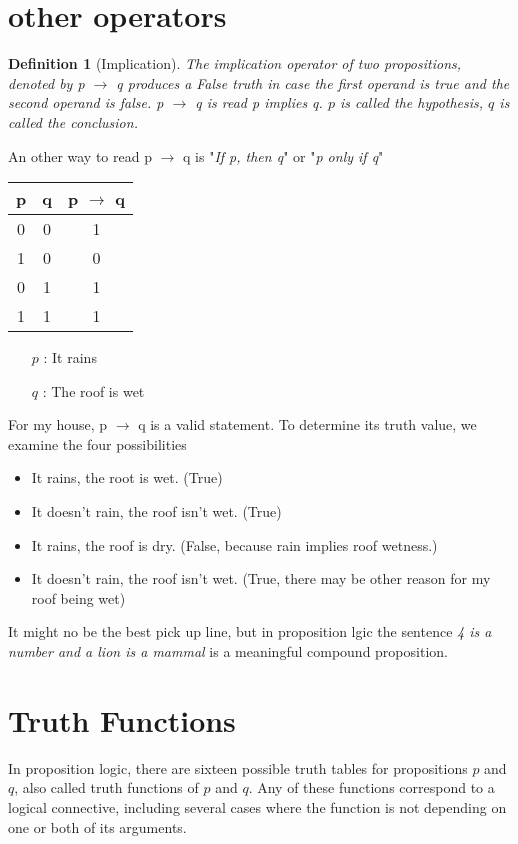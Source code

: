 \documentclass[10pt,a4paper,draft,titlepage,onecolumn]{book}
\newtheorem{definition}{Definition}[section]
\begin{document}
\section{other operators}

\begin{definition}[Implication] The implication operator of two propositions, denoted by p $\rightarrow$ q produces a False truth in case the first operand is true and the second operand is false.  p $\rightarrow$ q is read \textit{p implies q}. $p$ is called the \textit{hypothesis}, $q$ is called the \textit{conclusion}.
\end{definition} 
An other way to read p $\rightarrow$ q  is  "\textit{If p, then q}" or  "\textit{p only if  q}"

\begin{center}
\begin{tabular}{ |c|c|c| }
 \hline
 p & q &  p $\rightarrow$ q  \\
 \hline
 0 & 0 & 1 \\
 1 & 0 & 0 \\
 0 & 1 & 1 \\
 1 & 1 & 1 \\
 \hline
\end{tabular}
\end{center}


\begin{itemize}
\item[$p$]: It rains
\item[$q$]: The roof is wet
\end{itemize}

For my house, p $\rightarrow$ q is a valid statement.
To determine its truth value, we examine the four possibilities

\begin{itemize}
\item It rains, the root is wet. (True)
\item It doesn't rain, the roof isn't wet. (True)
\item It rains, the roof is dry. (False, because rain implies roof wetness.)
\item It doesn't rain, the roof isn't wet. (True, there may be other reason for my roof being wet)
\end{itemize}

It might no be the best pick up line, but in proposition lgic the sentence \textit{4 is a number and a lion is a mammal} is a meaningful compound proposition.

\section{Truth Functions}
In proposition logic, there are sixteen possible truth tables for propositions $p$ and $q$, also called truth functions of $p$ and $q$. Any of these functions correspond to a logical connective, including several cases where the function is  not depending on one or both of its arguments.
\end{document}
